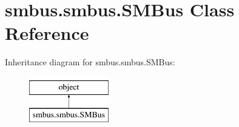 \hypertarget{classsmbus_1_1smbus_1_1SMBus}{}\section{smbus.\+smbus.\+S\+M\+Bus Class Reference}
\label{classsmbus_1_1smbus_1_1SMBus}
Inheritance diagram for smbus.\+smbus.\+S\+M\+Bus\+:\begin{figure}[H]
\begin{center}
\leavevmode
\includegraphics[height=2.000000cm]{classsmbus_1_1smbus_1_1SMBus}
\end{center}
\end{figure}
